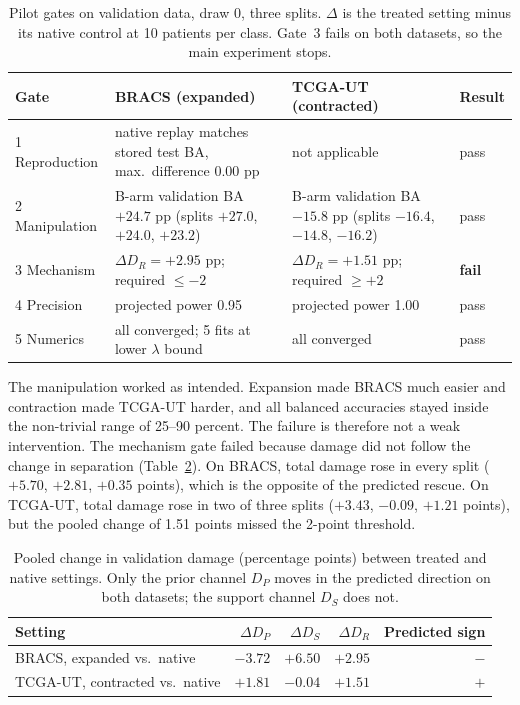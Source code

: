 \documentclass[11pt]{article}
\begin{document}
\begin{table}[ht]
  \centering
  \small
  \begin{tabularx}{\textwidth}{@{}lYYl@{}}
    \toprule
    Gate & BRACS (expanded) & TCGA-UT (contracted) & Result \\
     Reproduction & native replay matches stored test BA, max.\ difference 0.00 pp & not applicable & pass \\
    2 Manipulation & B-arm validation BA $+24.7$ pp (splits $+27.0$, $+24.0$, $+23.2$) & B-arm validation BA $-15.8$ pp (splits $-16.4$, $-14.8$, $-16.2$) & pass \\
    3 Mechanism & $\Delta D_R = +2.95$ pp; required $\le -2$ & $\Delta D_R = +1.51$ pp; required $\ge +2$ & \textbf{fail} \\
    4 Precision & projected power 0.95 & projected power 1.00 & pass \\
    5 Numerics & all converged; 5 fits at lower $\lambda$ bound & all converged & pass \\
    \bottomrule
  \end{tabularx}
  \caption{Pilot gates on validation data, draw 0, three splits. $\Delta$ is the treated setting minus its native control at 10 patients per class. Gate~3 fails on both datasets, so the main experiment stops.}
  \label{tab:gates}
\end{table}

The manipulation worked as intended. Expansion made BRACS much easier and contraction made TCGA-UT harder, and all balanced accuracies stayed inside the non-trivial range of 25--90 percent. The failure is therefore not a weak intervention. The mechanism gate failed because damage did not follow the change in separation (Table~\ref{tab:channels}). On BRACS, total damage rose in every split ($+5.70$, $+2.81$, $+0.35$ points), which is the opposite of the predicted rescue. On TCGA-UT, total damage rose in two of three splits ($+3.43$, $-0.09$, $+1.21$ points), but the pooled change of 1.51 points missed the 2-point threshold.

\begin{table}[ht]
  \centering
  \small
  \begin{tabular}{@{}lrrrr@{}}
    \toprule
    Setting & $\Delta D_P$ & $\Delta D_S$ & $\Delta D_R$ & Predicted sign \\
    \midrule
    BRACS, expanded vs.\ native     & $-3.72$ & $+6.50$ & $+2.95$ & $-$ \\
    TCGA-UT, contracted vs.\ native & $+1.81$ & $-0.04$ & $+1.51$ & $+$ \\
    \bottomrule
  \end{tabular}
  \caption{Pooled change in validation damage (percentage points) between treated and native settings. Only the prior channel $D_P$ moves in the predicted direction on both datasets; the support channel $D_S$ does not.}
  \label{tab:channels}
\end{table}
\end{document}
